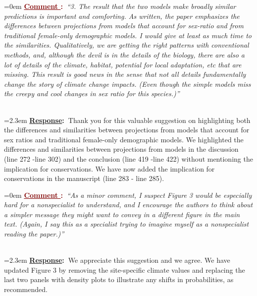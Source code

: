 \documentclass[12pt]{article}
\newcounter{cN}
\newcommand{\comment}[1]{
	\vspace{2em}
	\refstepcounter{cN} %
	\noindent \hangindent=0em \textbf{\textcolor{Maroon}{\uline{Comment \thecN}:~}}\emph{``#1''}
	}
\newcommand{\response}[1]{
	\\[0.25em]
	\hangindent=2.3em \textbf{\textcolor{NavyBlue}{\uline{Response}:~}}#1
	}
\begin{document}
\comment{3. The result that the two models make broadly similar predictions is important and comforting. As written, the paper emphasizes the differences between projections from models that account for sex-ratio and from traditional female-only demographic models. I would give at least as much time to the similarities. Qualitatively, we are getting the right patterns with conventional methods, and, although the devil is in the details of the biology, there are also a lot of details of the climate, habitat, potential for local adaptation, etc that are missing. This result is good news in the sense that not all details fundamentally change the story of climate change impacts. (Even though the simple models miss the creepy and cool changes in sex ratio for this species.)}
\response{Thank you for this valuable suggestion on highlighting both the differences and similarities between projections from models that account for sex ratios and traditional female-only demographic models. 
We highlighted the differences and similarities between projections from models in the discussion (line 272 -line 302) and the conclusion  (line 419 -line 422) without mentioning the implication for conservations. We have now added the implication for conservations in the manuscript (line  283 - line  285).}

\comment{As a minor comment, I suspect Figure 3 would be especially hard for a nonspecialist to understand, and I encourage the authors to think about a simpler message they might want to convey in a different figure in the main text. (Again, I say this as a specialist trying to imagine myself as a nonspecialist reading the paper.)}
\response{We appreciate this suggestion and we agree. 
We have updated Figure 3 by removing the site-specific climate values and replacing the last two panels with density plots to illustrate any shifts in probabilities, as  recommended.}


\end{document}
